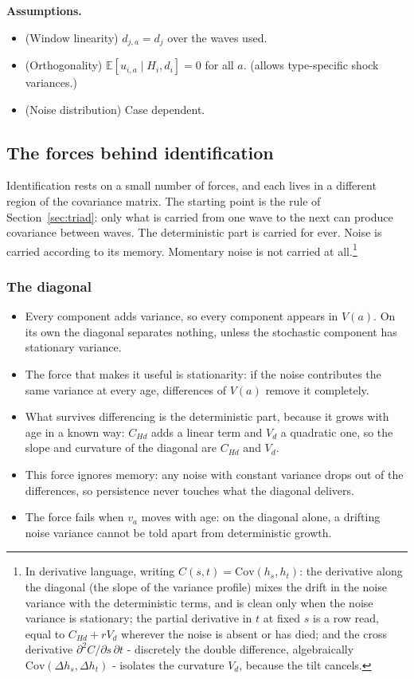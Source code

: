 \documentclass[11pt]{article}
\theoremstyle{remark}
\newcommand{\E}{\mathbb{E}}
\newcommand{\Cov}{\mathrm{Cov}}
\begin{document}
\noindent\textbf{Assumptions.}
\begin{itemize}
\item[A1.] (Window linearity) $d_{j,a}=d_j$ over the waves used.
\item[A2.] (Orthogonality) $\E[u_{i,a}\mid H_i,d_i]=0$ for all $a$. (allows type-specific shock variances.)
\item[A3.] (Noise distribution) Case dependent.
\end{itemize}

\subsection{The forces behind identification}\label{sec:forces}


Identification rests on a small number of forces, and each lives in a different region of the covariance matrix. The starting point is the rule of Section~\ref{sec:triad}: only what is carried from one wave to the next can produce covariance between waves.
The deterministic part is carried for ever.
Noise is carried according to its memory.
Momentary noise is not carried at all.\footnote{In derivative language, writing $C(s,t)=\Cov(h_s,h_t)$: the derivative along the diagonal (the slope of the variance profile) mixes the drift in the noise variance with the deterministic terms, and is clean only when the noise variance is stationary; the partial derivative in $t$ at fixed $s$ is a row read, equal to $C_{Hd}+rV_d$ wherever the noise is absent or has died; and the cross derivative $\partial^2C/\partial s\,\partial t$ - discretely the double difference, algebraically $\Cov(\Delta h_s,\Delta h_t)$ - isolates the curvature $V_d$, because the tilt cancels.}

\subsubsection*{The diagonal}

\begin{itemize}
\item Every component adds variance, so every component appears in $V(a)$. On its own the diagonal separates nothing, unless the stochastic component has stationary variance.
\item The force that makes it useful is stationarity: if the noise contributes the same variance at every age, differences of $V(a)$ remove it completely.
\item What survives differencing is the deterministic part, because it grows with age in a known way: $C_{Hd}$ adds a linear term and $V_d$ a quadratic one, so the slope and curvature of the diagonal are $C_{Hd}$ and $V_d$.
\item This force ignores memory: any noise with constant variance drops out of the differences, so persistence never touches what the diagonal delivers.
\item The force fails when $v_a$ moves with age: on the diagonal alone, a drifting noise variance cannot be told apart from deterministic growth.
\end{itemize}
\end{document}
